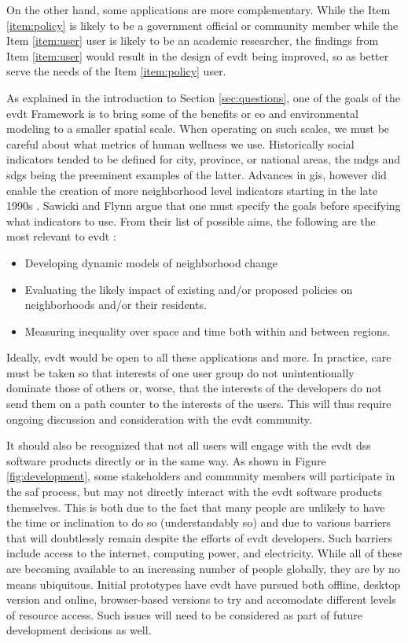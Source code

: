 On the other hand, some applications are more complementary. While the Item \ref{item:policy} is likely to be a government official or community member while the Item \ref{item:user} user is likely to be an academic researcher, the findings from Item \ref{item:user} would result in the design of \ac{evdt} being improved, so as better serve the needs of the Item \ref{item:policy} user.

As explained in the introduction to Section \ref{sec:questions}, one of the goals of the \ac{evdt} Framework is to bring some of the benefits or \ac{eo} and environmental modeling to a smaller spatial scale. When operating on such scales, we must be careful about what metrics of human wellness we use. Historically social indicators tended to be defined for city, province, or national areas, the \acp{mdg} and \acp{sdg} being the preeminent examples of the latter. Advances in \ac{gis}, however did enable the creation of more neighborhood level indicators starting in the late 1990s \cite{sawickiNeighborhoodIndicatorsReview1996}. Sawicki and Flynn argue that one must specify the goals before specifying what indicators to use. From their list of possible aims, the following are the most relevant to \ac{evdt} \cite{sawickiNeighborhoodIndicatorsReview1996}:

\begin{itemize}[itemsep=0pt,parsep=0pt]
	\item{Developing dynamic models of neighborhood change}
	\item{Evaluating the likely impact of existing and/or proposed policies on neighborhoods and/or their residents.}
	\item{Measuring inequality over space and time both within and between regions.}
\end{itemize}

Ideally, \ac{evdt} would be open to all these applications and more. In practice, care must be taken so that interests of one user group do not unintentionally dominate those of others or, worse, that the interests of the developers do not send them on a path counter to the interests of the users. This will thus require ongoing discussion and consideration with the \ac{evdt} community.

It should also be recognized that not all users will engage with the \ac{evdt} \ac{dss} software products directly or in the same way. As shown in Figure \ref{fig:development}, some stakeholders and community members will participate in the \ac{saf} process, but may not directly interact with the \ac{evdt} software products themselves. This is both due to the fact that many people are unlikely to have the time or inclination to do so (understandably so) and due to various barriers that will doubtlessly remain despite the efforts of \ac{evdt} developers. Such barriers include access to the internet, computing power, and electricity. While all of these are becoming available to an increasing number of people globally, they are by no means ubiquitous. Initial prototypes have \ac{evdt} have pursued both offline, desktop version and online, browser-based versions to try and accomodate different levels of resource access. Such issues will need to be considered as part of future development decisions as well.

